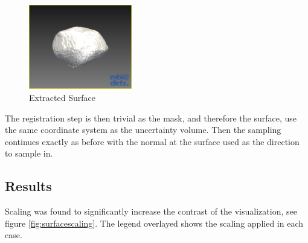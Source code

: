 \begin{figure}
  \vspace{-20pt}
  \includegraphics[width=0.4\textwidth]{images/surface/surface_raw.png}
  \caption{Extracted Surface}\label{fig:surfaceraw}
\end{figure}

The registration step is then trivial as the mask, and therefore the surface, use the same coordinate system as the uncertainty volume. Then the sampling continues exactly as before with the normal at the surface used as the direction to sample in.

\newpage
\subsection*{Results}
Scaling was found to significantly increase the contrast of the visualization, see figure \ref{fig:surfacescaling}. The legend overlayed shows the scaling applied in each case.

